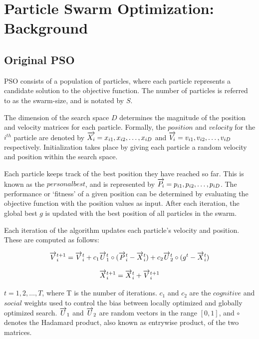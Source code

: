 \documentclass{csfourzero}
\newcommand{\rarrow}[1]{\overrightarrow{#1\vphantom{b}}}
\begin{document}
\section{Particle Swarm Optimization: Background}

\subsection{Original PSO}

PSO consists of a population of particles, where each particle represents a
candidate solution to the objective function.  The number of particles is
referred to as the swarm-size, and is notated by $S$.

The dimension of the search space $D$ determines the magnitude of the position
and velocity matrices for each particle. Formally, the $position$ and $velocity$
for the $i^{th}$ particle are denoted by
$\rarrow{X_i} = x_{i1}, x_{i2},\ldots,x_{iD}$ and
$\rarrow{V_i} = v_{i1}, v_{i2},\ldots,v_{iD}$ respectively.
Initialization takes place by giving each particle a random velocity and
position within the search space.

Each particle keeps track of the best position they have reached so far. This is
known as the $personal best$, and is represented by $\rarrow{P_i} = p_{i1}, p_{i2},\ldots,p_{iD}$.
The performance or `fitness' of a given position can be determined by evaluating
the objective function with the position values as input. After each iteration,
the global best $g$ is updated with the best position of all particles in the
swarm.

Each iteration of the algorithm updates each particle's velocity and position.
These are computed as follows:

\begin{equation} \label{eq:orig_v_update}
\rarrow{V}_i^{t+1} = \rarrow{V}_i^t + c_1 \rarrow{U}_1^t \circ (\rarrow{P}_i^t - \rarrow{X}_i^t) + c_2 \rarrow{U}^t_2 \circ (g^t - \rarrow{X}_i^t)
\end{equation}

\begin{equation} \label{eq:orig_p_update}
\rarrow{X}_i^{t+1} = \rarrow{X}_i^t + \rarrow{V}_i^{t+1}
\end{equation}

$t = 1, 2,\ldots,T$, where T is the number of iterations. $c_1$ and $c_2$ are
the $cognitive$ and $social$ weights used to control the bias between locally
optimized and globally optimized search. $\rarrow{U}_1$ and $\rarrow{U}_2$ are
random vectors in the range $[0,1]$, and $\circ$ denotes the Hadamard product,
also known as entrywise product, of the two matrices.
\end{document}
